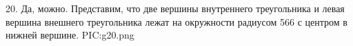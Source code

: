 20. Да, можно. Представим, что две вершины внутреннего треугольника и левая вершина внешнего треугольника лежат на окружности радиусом 566 с центром в нижней вершине.
{{PIC:g20.png}}\newpage\noindent

